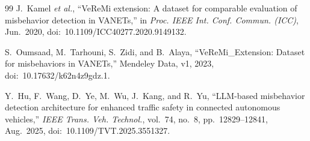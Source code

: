 \documentclass[journal,twoside]{IEEEtran}
\begin{document}
\begin{thebibliography}{99}
J.~Kamel \emph{et al.}, ``{VeReMi} extension: A dataset for comparable evaluation of misbehavior detection in {VANETs},'' in \emph{Proc. IEEE Int. Conf. Commun. (ICC)}, Jun.~2020, doi:~10.1109/ICC40277.2020.9149132.

S.~Oumsaad, M.~Tarhouni, S.~Zidi, and B.~Alaya, ``{VeReMi\_Extension}: Dataset for misbehaviors in {VANETs},'' Mendeley Data, v1, 2023, doi:~10.17632/k62n4z9gdz.1.

Y.~Hu, F.~Wang, D.~Ye, M.~Wu, J.~Kang, and R.~Yu, ``{LLM}-based misbehavior detection architecture for enhanced traffic safety in connected autonomous vehicles,'' \emph{IEEE Trans. Veh. Technol.}, vol.~74, no.~8, pp.~12829--12841, Aug.~2025, doi:~10.1109/TVT.2025.3551327.

\end{thebibliography}
\end{document}
